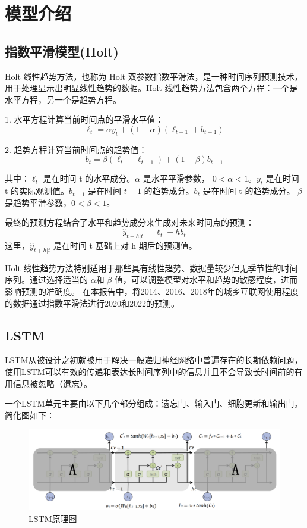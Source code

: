 \chapter{模型介绍}
\label{chapter:model}
\section{指数平滑模型(Holt)}
Holt 线性趋势方法，也称为 Holt 双参数指数平滑法，是一种时间序列预测技术，用于处理显示出明显线性趋势的数据。Holt 线性趋势方法包含两个方程：一个是水平方程，另一个是趋势方程。

1. 水平方程计算当前时间点的平滑水平值：
\begin{equation}
\ell_t = \alpha y_t + (1 - \alpha)(\ell_{t-1} + b_{t-1}) 
\end{equation}

2. 趋势方程计算当前时间点的趋势值：
\begin{equation}
b_t = \beta(\ell_t - \ell_{t-1}) + (1 - \beta)b_{t-1} 
\end{equation}

其中：$\ell_t$  是在时间  t  的水平成分。$\alpha $ 是水平平滑参数， $0 < \alpha < 1 $。$y_t$  是在时间  t  的实际观测值。$b_{t-1} $ 是在时间 $ t-1 $ 的趋势成分。$b_t $ 是在时间  t  的趋势成分。
$\beta $ 是趋势平滑参数，$ 0 < \beta < 1 $。

最终的预测方程结合了水平和趋势成分来生成对未来时间点的预测：
\begin{equation}
\hat{y}_{t+h|t} = \ell_t + hb_t 
\end{equation}
这里，$ \hat{y}_{t+h|t}$  是在时间  t  基础上对  h  期后的预测值。

Holt 线性趋势方法特别适用于那些具有线性趋势、数据量较少但无季节性的时间序列。通过选择适当的 $ \alpha$和  $\beta$  值，可以调整模型对水平和趋势的敏感程度，进而影响预测的准确度。
在本报告中，将2014、2016、2018年的城乡互联网使用程度的数据通过指数平滑法进行2020和2022的预测。

\section{LSTM}
LSTM从被设计之初就被用于解决一般递归神经网络中普遍存在的长期依赖问题，使用LSTM可以有效的传递和表达长时间序列中的信息并且不会导致长时间前的有用信息被忽略（遗忘）。

一个LSTM单元主要由以下几个部分组成：遗忘门、输入门、细胞更新和输出门。简化图如下：

\begin{figure}
    \centering
    \includegraphics[width=0.9\linewidth]{figures/30.png}
    \caption{LSTM原理图}
    \label{fig:enter-label}
\end{figure}

